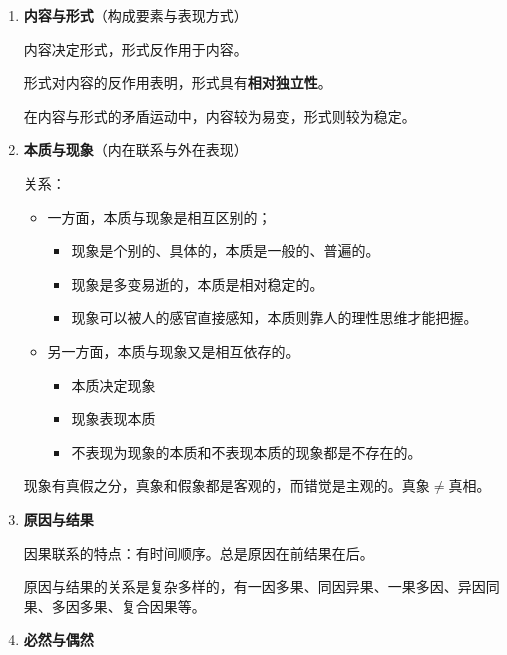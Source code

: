 \documentclass[12pt, a4paper, oneside]{ctexart}
\begin{document}
\begin{enumerate}
  \item {\bf 内容与形式}（构成要素与表现方式）
  
  内容决定形式，形式反作用于内容。

  形式对内容的反作用表明，形式具有\textbf{相对独立性}。

  在内容与形式的矛盾运动中，内容较为易变，形式则较为稳定。

  \item {\bf 本质与现象}（内在联系与外在表现）
  
  关系：
  \begin{itemize}
    \item 一方面，本质与现象是相互区别的；
    \begin{itemize}
      \item 现象是个别的、具体的，本质是一般的、普遍的。
      \item 现象是多变易逝的，本质是相对稳定的。
      \item 现象可以被人的感官直接感知，本质则靠人的理性思维才能把握。
    \end{itemize}
    \item 另一方面，本质与现象又是相互依存的。
    \begin{itemize}
      \item 本质决定现象
      \item 现象表现本质
      \item 不表现为现象的本质和不表现本质的现象都是不存在的。
    \end{itemize}
  \end{itemize}

  现象有真假之分，真象和假象都是客观的，而错觉是主观的。真象$\neq$真相。

  \item {\bf 原因与结果}
  
  因果联系的特点：有时间顺序。总是原因在前结果在后。

  原因与结果的关系是复杂多样的，有一因多果、同因异果、一果多因、异因同果、多因多果、复合因果等。

  \item {\bf 必然与偶然}
  

\end{enumerate}
\end{document}
